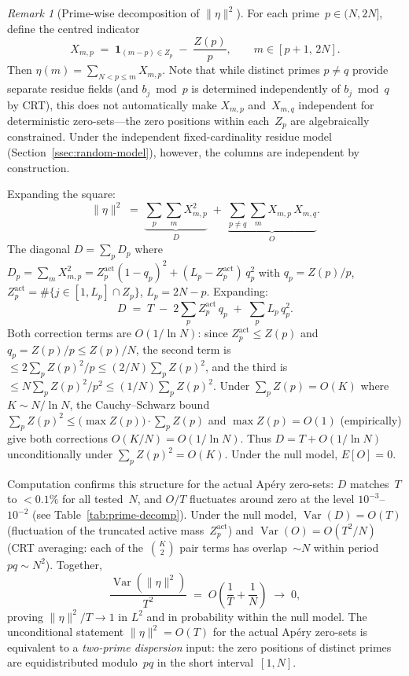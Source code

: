 \documentclass[11pt]{article}
\theoremstyle{definition}
\theoremstyle{remark}
\newtheorem{remark}[theorem]{Remark}
\begin{document}
\begin{remark}[Prime-wise decomposition of $\|\eta\|^2$]
\label{rem:prime-decomposition}
For each prime~$p \in (N,2N]$, define
the centred indicator
\[
X_{m,p}
\;=\;
\mathbf{1}_{(m-p) \in Z_p}
\;-\;
\frac{Z(p)}{p},
\qquad
m \in [p{+}1,\,2N].
\]
Then $\eta(m) = \sum_{N < p \le m} X_{m,p}$.
Note that while distinct primes
$p \ne q$ provide separate residue fields
(and $b_j \bmod p$ is determined
independently of $b_j \bmod q$ by CRT),
this does not automatically make
$X_{m,p}$ and~$X_{m,q}$ independent
for deterministic zero-sets---the
zero positions within each~$Z_p$ are
algebraically constrained.
Under the independent
fixed-cardinality residue model
(Section~\ref{ssec:random-model}),
however, the columns are independent
by construction.

Expanding the square:
\begin{equation}\label{eq:eta-prime-decomp}
\|\eta\|^2
\;=\;
\underbrace{\sum_p \sum_m X_{m,p}^2}_{D}
\;+\;
\underbrace{\sum_{p \ne q}\sum_m X_{m,p}\,X_{m,q}}_{O}.
\end{equation}
The diagonal $D = \sum_p D_p$ where
$D_p = \sum_m X_{m,p}^2 = Z_p^{\mathrm{act}}(1{-}q_p)^2
+ (L_p - Z_p^{\mathrm{act}})\,q_p^2$
with $q_p = Z(p)/p$,
$Z_p^{\mathrm{act}} = \#\{j \in [1,L_p] \cap Z_p\}$,
$L_p = 2N - p$.
Expanding:
\begin{equation}\label{eq:D-identity}
D \;=\; T
\;-\; 2\sum_p Z_p^{\mathrm{act}}\,q_p
\;+\; \sum_p L_p\,q_p^2.
\end{equation}
Both correction terms are $O(1/\ln N)$:
since $Z_p^{\mathrm{act}} \le Z(p)$ and
$q_p = Z(p)/p \le Z(p)/N$, the second
term is $\le 2\sum_p Z(p)^2/p
\le (2/N)\sum_p Z(p)^2$, and the
third is $\le N\sum_p Z(p)^2/p^2
\le (1/N)\sum_p Z(p)^2$.
Under $\sum_p Z(p) = O(K)$
where $K \sim N/\ln N$,
the Cauchy--Schwarz bound
$\sum_p Z(p)^2 \le
\bigl(\max Z(p)\bigr)\cdot\sum_p Z(p)$
and $\max Z(p) = O(1)$ (empirically)
give both corrections $O(K/N) = O(1/\ln N)$.
Thus $D = T + O(1/\ln N)$ unconditionally
under $\sum_p Z(p)^2 = O(K)$.
Under the null model, $E[O] = 0$.

Computation confirms this structure
for the actual Ap\'ery zero-sets:
$D$ matches~$T$ to $< 0.1\%$ for all
tested~$N$, and $O/T$ fluctuates
around zero at the level $10^{-3}$--$10^{-2}$
(see Table~\ref{tab:prime-decomp}).
Under the null model,
$\operatorname{Var}(D) = O(T)$
(fluctuation of the truncated
active mass~$Z_p^{\mathrm{act}}$)
and
$\operatorname{Var}(O) = O(T^2/N)$
(CRT averaging: each of
the~$\binom{K}{2}$ pair terms has
overlap~$\sim N$ within
period~$pq \sim N^2$).
Together,
\[
\frac{\operatorname{Var}(\|\eta\|^2)}{T^2}
\;=\; O\!\left(\frac{1}{T} + \frac{1}{N}\right)
\;\to\; 0,
\]
proving $\|\eta\|^2/T \to 1$ in
$L^2$ and in probability within
the null model.
The unconditional statement
$\|\eta\|^2 = O(T)$ for the
actual Ap\'ery zero-sets is equivalent
to a \emph{two-prime dispersion} input:
the zero positions of distinct primes
are equidistributed modulo~$pq$
in the short interval~$[1,N]$.


\end{remark}
\end{document}
